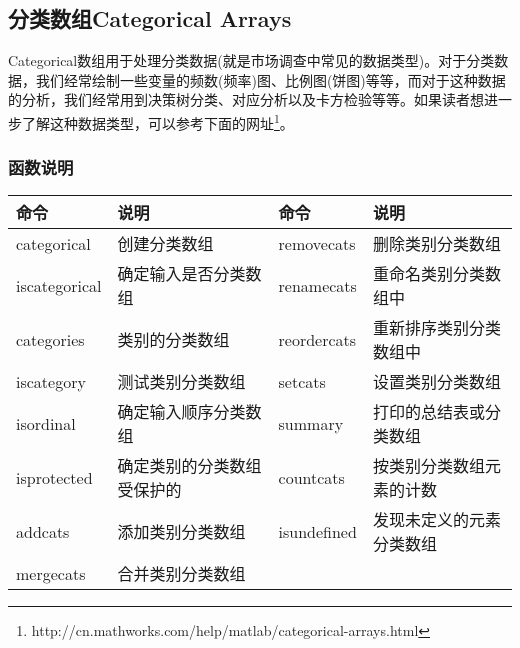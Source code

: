     \subsection{分类数组Categorical Arrays}
        \par
        Categorical数组用于处理分类数据(就是市场调查中常见的数据类型)。对于分类数据，我们经常绘制一些变量的频数(频率)图、比例图(饼图)等等，而对于这种数据的分析，我们经常用到决策树分类、对应分析以及卡方检验等等。如果读者想进一步了解这种数据类型，可以参考下面的网址\footnote{http://cn.mathworks.com/help/matlab/categorical-arrays.html}。
        \subsubsection{函数说明}
            \begin{table}[H]
            \centering
                \begin{tabularx}{\textwidth}{lXlX}
                \toprule
             命令& 说明& 命令& 说明\\\midrule
            categorical & 创建分类数组 & removecats & 删除类别分类数组\\
            iscategorical  & 确定输入是否分类数组&renamecats & 重命名类别分类数组中\\
            categories & 类别的分类数组&reordercats & 重新排序类别分类数组中\\
            iscategory & 测试类别分类数组&setcats & 设置类别分类数组\\
            isordinal & 确定输入顺序分类数组&summary & 打印的总结表或分类数组\\
            isprotected&确定类别的分类数组 受保护的&countcats & 按类别分类数组元素的计数\\
            addcats & 添加类别分类数组&isundefined & 发现未定义的元素分类数组\\
            mergecats & 合并类别分类数组&{}&{}\\
                \bottomrule
            \end{tabularx}
            \end{table}
